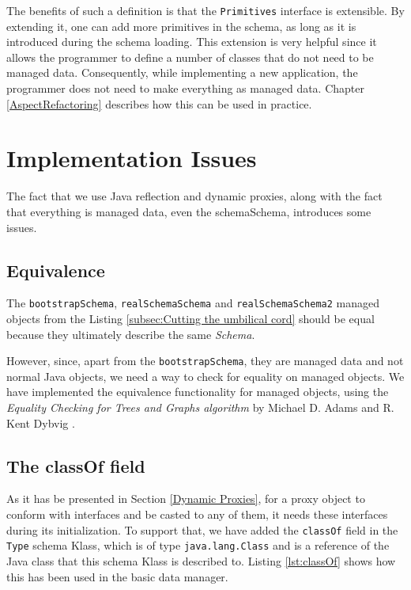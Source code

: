 The benefits of such a definition is that the \texttt{Primitives} interface is extensible.
By extending it, one can add more primitives in the schema, as long as it is introduced during the schema loading.
This extension is very helpful since it allows the programmer to define a number of classes that do not need to be managed data.
Consequently, while implementing a new application, the programmer does not need to make everything as managed data.
Chapter \ref{AspectRefactoring} describes how this can be used in practice.

\section{Implementation Issues}\label{Implementation Issues}
The fact that we use Java reflection and dynamic proxies, along with the fact that everything is managed data, even the schemaSchema, introduces some issues.

\subsection{Equivalence}\label{Managed Object equivalence}
The \texttt{bootstrapSchema}, \texttt{realSchemaSchema} and \texttt{realSchemaSchema2} managed objects from the Listing \ref{subsec:Cutting the umbilical cord} should be equal because they ultimately describe the same \textit{Schema}.

However, since, apart from the \texttt{bootstrapSchema}, they are managed data and not normal Java objects, we need a way to check for equality on managed objects.
We have implemented the equivalence functionality for managed objects, using the \textit{Equality Checking for Trees and Graphs algorithm} by Michael D. Adams and R. Kent Dybvig \cite{adams2008efficient}.

\subsection{The classOf field}\label{The classOf field}
As it has be presented in Section \ref{Dynamic Proxies}, for a proxy object to conform with interfaces and be casted to any of them, it needs these interfaces during its initialization.
To support that, we have added the \texttt{classOf} field in the \texttt{Type} schema Klass, which is of type \texttt{java.lang.Class} and is a reference of the Java class that this schema Klass is described to.
Listing \ref{lst:classOf} shows how this has been used in the basic data manager.

